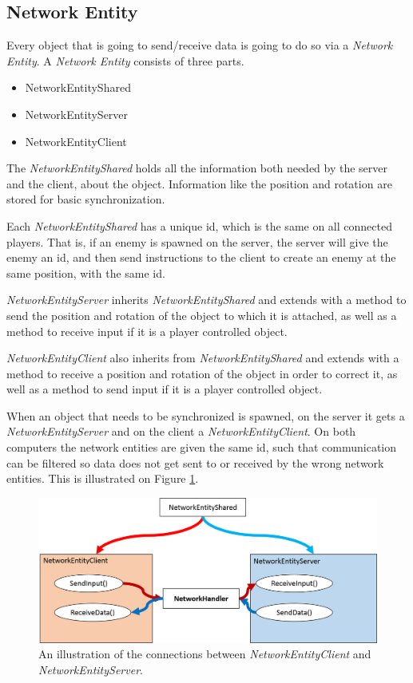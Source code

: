 \subsection{Network Entity}
Every object that is going to send/receive data is going to do so via a \emph{Network Entity}.
A \emph{Network Entity} consists of three parts.
\begin{itemize}
\item NetworkEntityShared
\item NetworkEntityServer
\item NetworkEntityClient
\end{itemize}

The \emph{NetworkEntityShared} holds all the information both needed by the server and the client, about the object.
Information like the position and rotation are stored for basic synchronization.

Each \emph{NetworkEntityShared} has a unique id, which is the same on all connected players.
That is, if an enemy is spawned on the server, the server will give the enemy an id, and then send instructions to the client to create an enemy at the same position, with the same id.

\emph{NetworkEntityServer} inherits \emph{NetworkEntityShared} and extends with a method to send the position and rotation of the object to which it is attached, as well as a method to receive input if it is a player controlled object.

\emph{NetworkEntityClient} also inherits from \emph{NetworkEntityShared} and extends with a method to receive a position and rotation of the object in order to correct it, as well as a method to send input if it is a player controlled object.

When an object that needs to be synchronized is spawned, on the server it gets a \emph{NetworkEntityServer} and on the client a \emph{NetworkEntityClient}.
On both computers the network entities are given the same id, such that communication can be filtered so data does not get sent to or received by the wrong network entities.
This is illustrated on Figure \ref{fig:networkEntity}.

\begin{figure}
\includegraphics[scale=0.5]{figures/network/networkEntity}
\caption{An illustration of the connections between \emph{NetworkEntityClient} and \emph{NetworkEntityServer}.}
\label{fig:networkEntity}
\end{figure}

